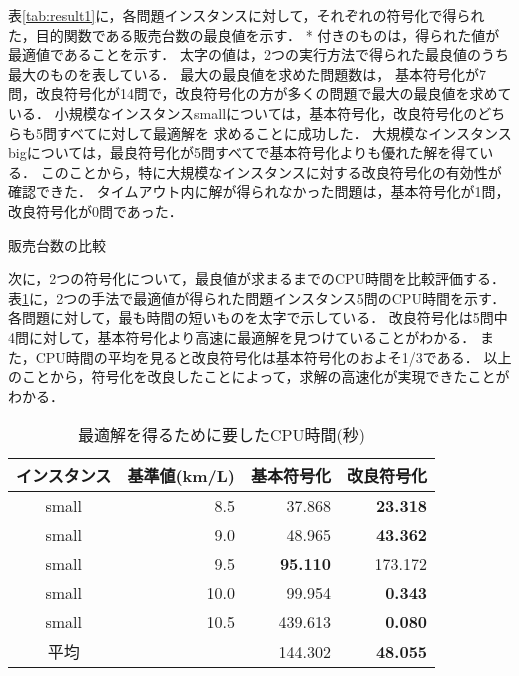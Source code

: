 表\ref{tab:result1}に，各問題インスタンスに対して，それぞれの符号化で得られた，目的関数である販売台数の最良値を示す．
* 付きのものは，得られた値が最適値であることを示す．
太字の値は，2つの実行方法で得られた最良値のうち最大のものを表している．
最大の最良値を求めた問題数は，
基本符号化が7問，改良符号化が14問で，改良符号化の方が多くの問題で最大の最良値を求めている．
小規模なインスタンスsmallについては，基本符号化，改良符号化のどちらも5問すべてに対して最適解を
求めることに成功した．
大規模なインスタンスbigについては，最良符号化が5問すべてで基本符号化よりも優れた解を得ている．
このことから，特に大規模なインスタンスに対する改良符号化の有効性が確認できた．
タイムアウト内に解が得られなかった問題は，基本符号化が1問，改良符号化が0問であった．

\begin{table}[tbp]
  \caption{販売台数の比較}
  \label{tab:result1}
  \centering
  \begin{tableB}
    
  \end{tableB}
\end{table}


次に，2つの符号化について，最良値が求まるまでのCPU時間を比較評価する．
表\ref{tab:result2}に，2つの手法で最適値が得られた問題インスタンス5問のCPU時間を示す．
各問題に対して，最も時間の短いものを太字で示している．
改良符号化は5問中4問に対して，基本符号化より高速に最適解を見つけていることがわかる．
また，CPU時間の平均を見ると改良符号化は基本符号化のおよそ1/3である．
以上のことから，符号化を改良したことによって，求解の高速化が実現できたことがわかる．
\begin{table}[tbp]
	\caption{最適解を得るために要したCPU時間(秒)}
	\label{tab:result2}
	\centering
	\begin{tabular}{crrr}\hline
 	インスタンス	& 基準値(km/L)                & 基本符号化  & 改良符号化   \\\hline
	small 	& 8.5  & 37.868          & \textbf{23.318}          \\
 	small	& 9.0  & 48.965          & \textbf{43.362}          \\
 	small	& 9.5  & \textbf{95.110}          & 173.172         \\
 	small	& 10.0 & 99.954          & \textbf{0.343}           \\
 	small	& 10.5 & 439.613         & \textbf{0.080}           \\\hline
	平均 	& 			 & 144.302			& \textbf{48.055}				\\\hline
	\end{tabular}
\end{table}


